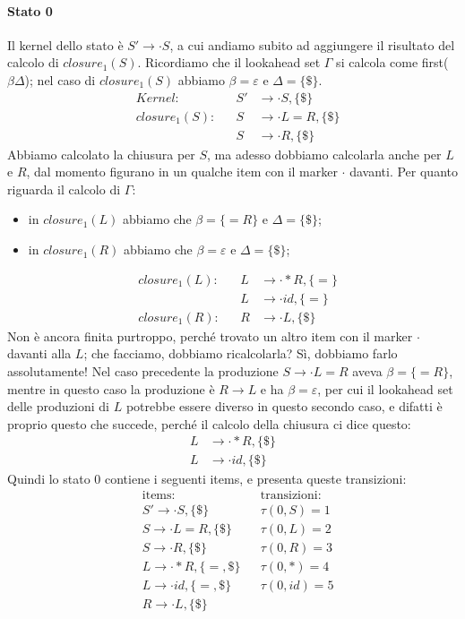 \documentclass[class=book, crop=false, oneside, 12pt]{standalone}
\begin{document}
\paragraph{Stato 0}
Il kernel dello stato è \(S' \to \cdot S\), a cui andiamo subito ad aggiungere il risultato del calcolo di \(closure_1(S)\). Ricordiamo che il lookahead set \(\Gamma\) si calcola come first(\(\beta\Delta\)); nel caso di \(closure_1(S)\) abbiamo \(\beta = \varepsilon\) e \(\Delta = \{\$\}\).
\begin{align*}
    &&Kernel: &&S' &\to \cdot S, \{\$\}& \\
    &&closure_1(S): &&S &\to \cdot L = R, \{\$\} &\\
    && &&S &\to \cdot R, \{\$\} &
\end{align*}
Abbiamo calcolato la chiusura per \(S\), ma adesso  dobbiamo calcolarla anche per \(L\) e \(R\), dal momento figurano in un qualche item con il marker \(\cdot\) davanti. Per quanto riguarda il calcolo di \(\Gamma\):
\begin{itemize}
    \item in \(closure_1(L)\) abbiamo che \(\beta = \{=R\}\) e \(\Delta = \{\$\}\);
    \item in \(closure_1(R)\) abbiamo che \(\beta = \varepsilon\) e \(\Delta = \{\$\}\);
\end{itemize}
\begin{align*}
    &&closure_1(L): &&L &\to \cdot \ast R, \{=\} &\\
    && &&L &\to \cdot id, \{=\} &\\
    &&closure_1(R): &&R &\to \cdot L, \{\$\}&
\end{align*}
Non è ancora finita purtroppo, perché trovato un altro item con il marker \(\cdot\) davanti alla \(L\); che facciamo, dobbiamo ricalcolarla? Sì, dobbiamo farlo assolutamente! Nel caso precedente la produzione \(S \to \cdot L = R\) aveva \(\beta = \{=R\}\), mentre in questo caso la produzione è \(R \to L\) e ha \(\beta = \varepsilon\), per cui il lookahead set delle produzioni di \(L\) potrebbe essere diverso in questo secondo caso, e difatti è proprio questo che succede, perché il calcolo della chiusura ci dice questo:
\begin{align*}
    L &\to \cdot \ast R, \{\$\} \\
    L &\to \cdot id, \{\$\}
\end{align*}
Quindi lo stato 0 contiene i seguenti items, e presenta queste transizioni:
\begin{align*}
    &\textrm{items:} & &\textrm{transizioni:} \\
    &S' \to \cdot S, \{\$\}  & &\tau(0, S) = 1 \\
    &S \to \cdot L = R, \{\$\}  & &\tau(0, L) = 2 \\
    &S \to \cdot R, \{\$\}  & &\tau(0, R) = 3 \\
    &L \to \cdot \ast R, \{=, \$\}  & &\tau(0, \ast) = 4 \\
    &L \to \cdot id, \{=, \$\}  & &\tau(0, id) = 5 \\
    &R \to \cdot L, \{\$\}  & &
\end{align*}
\end{document}
